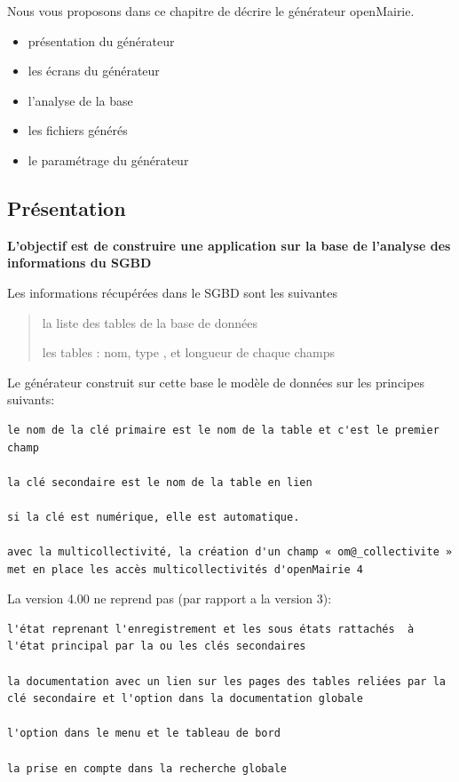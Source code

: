 \documentclass[letterpaper,10pt,french]{manual}
\begin{document}
Nous vous proposons dans ce chapitre de décrire le générateur openMairie.
\begin{itemize}
\item {} 
présentation du générateur

\item {} 
les écrans du générateur

\item {} 
l'analyse de la base

\item {} 
les fichiers générés

\item {} 
le paramétrage du générateur

\end{itemize}

\resetcurrentobjects
\hypertarget{--doc-generateur/presentation_generateur}{}

\hypertarget{presentation-generateur}{}\subsection{Présentation}

\textbf{L'objectif est de construire une application sur la base de l'analyse des informations  du SGBD}

Les informations récupérées dans le SGBD sont les suivantes
\begin{quote}

la liste des tables de la base de données

les tables : nom, type , et longueur de chaque champs
\end{quote}

Le générateur construit sur cette base le modèle de données sur les principes suivants:

\begin{Verbatim}[commandchars=@\[\]]
le nom de la clé primaire est le nom de la table et c'est le premier champ

la clé secondaire est le nom de la table en lien

si la clé est numérique, elle est automatique.

avec la multicollectivité, la création d'un champ « om@_collectivite » met en place les accès multicollectivités d'openMairie 4
\end{Verbatim}

La version 4.00 ne reprend pas (par rapport a la version 3):

\begin{Verbatim}[commandchars=@\[\]]
l'état reprenant l'enregistrement et les sous états rattachés  à l'état principal par la ou les clés secondaires

la documentation avec un lien sur les pages des tables reliées par la clé secondaire et l'option dans la documentation globale

l'option dans le menu et le tableau de bord

la prise en compte dans la recherche globale
\end{Verbatim}
\end{document}
